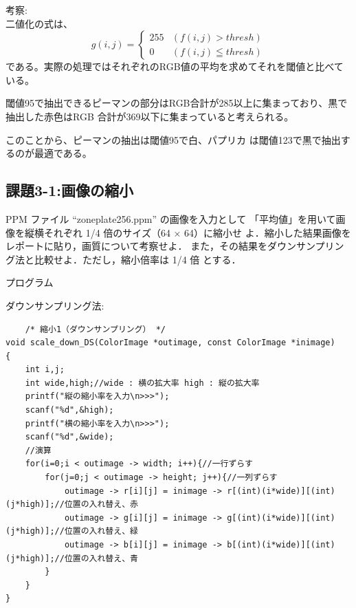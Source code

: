 \documentclass[a4paper,titlepage,11pt]{ltjsarticle}
\begin{document}
考察:\\
二値化の式は、
\begin{equation}
	g(i,j)=
\left\{\begin{array}{ll}
255 & (f(i,j) > thresh) \\
0 & (f(i,j) \leqq  thresh)
\end{array}
\right.
\end{equation}
である。実際の処理ではそれぞれのRGB値の平均を求めてそれを閾値と比べている。

閾値95で抽出できるピーマンの部分はRGB合計が285以上に集まっており、黒で抽出した赤色はRGB
合計が369以下に集まっていると考えられる。

このことから、ピーマンの抽出は閾値95で白、パプリカ
は閾値123で黒で抽出するのが最適である。

\subsection*{課題3-1:画像の縮小}
PPM ファイル “zoneplate256.ppm” の画像を入力として
「平均値」を用いて画像を縦横それぞれ 1/4 倍のサイズ（64 × 64）に縮小せ
よ．縮小した結果画像をレポートに貼り，画質について考察せよ．
また，その結果をダウンサンプリング法と比較せよ．ただし，縮小倍率は 1/4 倍
とする．

プログラム

ダウンサンプリング法:
\begin{lstlisting}
	/* 縮小1（ダウンサンプリング） */
void scale_down_DS(ColorImage *outimage, const ColorImage *inimage)
{
    int i,j;
	int wide,high;//wide : 横の拡大率 high : 縦の拡大率
	printf("縦の縮小率を入力\n>>>");
	scanf("%d",&high);
	printf("横の縮小率を入力\n>>>");
	scanf("%d",&wide);
	//演算
	for(i=0;i < outimage -> width; i++){//一行ずらす
		for(j=0;j < outimage -> height; j++){//一列ずらす
			outimage -> r[i][j] = inimage -> r[(int)(i*wide)][(int)(j*high)];//位置の入れ替え、赤
			outimage -> g[i][j] = inimage -> g[(int)(i*wide)][(int)(j*high)];//位置の入れ替え、緑
			outimage -> b[i][j] = inimage -> b[(int)(i*wide)][(int)(j*high)];//位置の入れ替え、青
		}
	}
}
\end{lstlisting}
\end{document}

